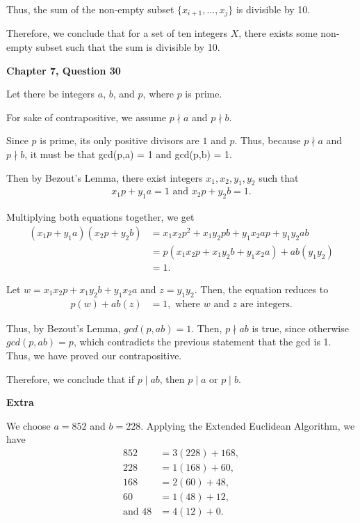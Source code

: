 \documentclass[12pt]{article}
\begin{document}
Thus, the sum of the non-empty subset $\{x_{i+1}, \dots, x_j\}$ is divisible by 10.

Therefore, we conclude that for a set of ten integers $X$, there exists some non-empty subset such that the sum is divisible by 10.

\vspace{25pt}

\noindent \textbf{Chapter 7, Question 30}

Let there be integers $a$, $b$, and $p$, where $p$ is prime.

For sake of contrapositive, we assume $p \nmid a$ and $p \nmid b$.

Since $p$ is prime, its only positive divisors are $1$ and $p$.
Thus, because $p \nmid a$ and $p \nmid b$, it must be that gcd(p,a) = 1 and gcd(p,b) = 1.

Then by Bezout's Lemma, there exist integers $x_1, x_2, y_1, y_2$ such that
\begin{align*}
    x_1p + y_1a = 1  \text{ and } x_2p + y_2b  = 1.
\end{align*}

Multiplying both equations together, we get
\begin{align*}
    (x_1p + y_1a)(x_2p + y_2b) & = x_1x_2 p^2 + x_1y_2 pb + y_1x_2 ap + y_1y_2 ab \\
                               & = p (x_1x_2p + x_1y_2b + y_1x_2a) + ab(y_1y_2)   \\
                               & = 1.
\end{align*}

Let $w = x_1x_2p + x_1y_2b + y_1x_2a$ and $z = y_1y_2$.
Then, the equation reduces to
\begin{align*}
    p(w) + ab(z) & = 1, \text{ where $w$ and $z$ are integers.}
\end{align*}

Thus, by Bezout's Lemma, $gcd(p,ab) = 1$.
Then, $p \nmid{ab}$ is true, since otherwise $gcd(p,ab) = p$, which contradicts the previous statement that the gcd is 1.
Thus, we have proved our contrapositive.

Therefore, we conclude that if $p \mid ab$, then $p \mid a$ or $p \mid b$.

\vspace{25pt}

\noindent \textbf{Extra}

We choose $a = 852$ and $b = 228$.
Applying the Extended Euclidean Algorithm, we have
\begin{align*}
    852            & = 3 (228) + 168, \\
    228            & = 1 (168) + 60,  \\
    168            & = 2 (60) + 48,   \\
    60             & = 1 (48) + 12,   \\
    \text{and } 48 & = 4 (12) + 0.
\end{align*}
\end{document}
